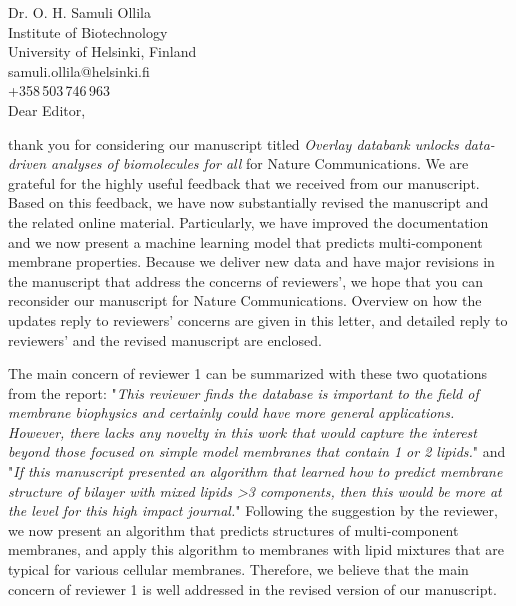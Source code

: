 \documentclass[11pt]{letter}
\begin{document}
\reversemarginpar
\pagestyle{empty}
\noindent Dr. O. H. Samuli Ollila \\
\noindent Institute of Biotechnology \\
\noindent University of Helsinki, Finland \\
\noindent samuli.ollila@helsinki.fi\\
\noindent +358\,503\,746\,963 \\


Dear Editor,

thank you for considering our manuscript titled {\it Overlay databank unlocks data-driven analyses of biomolecules for all} for Nature Communications. We are grateful for the highly useful feedback that we received from our manuscript. Based on this feedback, we have now substantially revised the manuscript and the related online material. Particularly, we have improved the documentation and we now present a machine learning model that predicts multi-component membrane properties. Because we deliver new data and have major revisions in the manuscript that address the concerns of reviewers', we hope that you can reconsider our manuscript for Nature Communications. Overview on how the updates reply to reviewers' concerns are given in this letter, and detailed reply to reviewers' and the revised manuscript are enclosed.

The main concern of reviewer 1 can be summarized with these two quotations from the report: "\textit{This reviewer finds the database is important to the field of membrane biophysics and certainly could have more general applications. However, there lacks any novelty in this work that would capture the interest beyond those focused on simple model membranes that contain 1 or 2 lipids.}" and "\textit{If this manuscript presented an algorithm that learned how to predict membrane structure of bilayer with mixed lipids >3 components, then this would be more at the level for this high impact journal.}" Following the suggestion by the reviewer, we now present an algorithm that predicts structures of multi-component membranes, and apply this algorithm to membranes with lipid mixtures that are typical for various cellular membranes. Therefore, we believe that the main concern of reviewer 1 is well addressed in the revised version of our manuscript.
\end{document}

